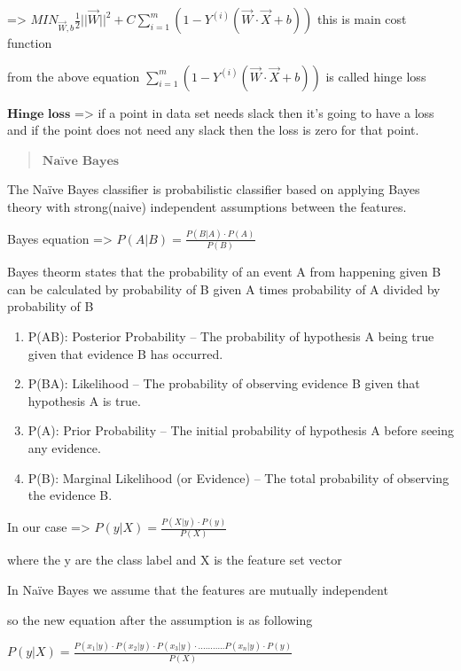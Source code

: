 \documentclass[11pt]{article}
\providecommand{\tightlist}{%
      \setlength{\itemsep}{0pt}\setlength{\parskip}{0pt}}
\begin{document}
    =\textgreater{}
\(MIN_{\vec{W},b} \frac{1}{2} ||\vec{W}||^2 + C \sum_{i = 1}^{m} (1 - Y^{(i)}(\vec{W} \cdot \vec{X} + b))\)
this is main cost function

    from the above equation
\(\sum_{i = 1}^{m} (1 - Y^{(i)}(\vec{W} \cdot \vec{X} + b))\) is called
hinge loss

    \(\textbf{Hinge loss}\) =\textgreater{} if a point in data set needs
slack then it's going to have a loss and if the point does not need any
slack then the loss is zero for that point.

    \begin{quote}
\(\textbf{Naïve  Bayes}\)
\end{quote}

    The Naïve Bayes classifier is probabilistic classifier based on applying
Bayes theory with strong(naive) independent assumptions between the
features.

    Bayes equation =\textgreater{}
\(P(A|B) = \frac{P(B|A) \cdot P(A)}{P(B)}\)

    Bayes theorm states that the probability of an event A from happening
given B can be calculated by probability of B given A times probability
of A divided by probability of B

    \begin{enumerate}
\def\labelenumi{\arabic{enumi}.}
\tightlist
\item
  P(A\textbar B): Posterior Probability -- The probability of hypothesis
  A being true given that evidence B has occurred.
\item
  P(B\textbar A): Likelihood -- The probability of observing evidence B
  given that hypothesis A is true.
\item
  P(A): Prior Probability -- The initial probability of hypothesis A
  before seeing any evidence.
\item
  P(B): Marginal Likelihood (or Evidence) -- The total probability of
  observing the evidence B.
\end{enumerate}

    In our case =\textgreater{} \(P(y|X) = \frac{P(X|y) \cdot P(y)}{P(X)}\)

    where the y are the class label and X is the feature set vector

    In Naïve Bayes we assume that the features are mutually independent

    so the new equation after the assumption is as following

    \(P(y|X) = \frac{P(x_1|y) \cdot P(x_2|y) \cdot P(x_3|y) \cdot ........... P(x_n|y) \cdot P(y)}{P(X)}\)
\end{document}
